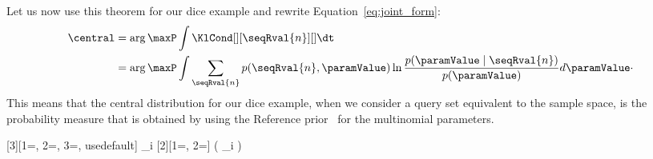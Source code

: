 Let us now use this theorem for our dice example and rewrite Equation~\ref{eq:joint_form}:
\begin{align*}
    \central &= \arg\maxP \int \KlCond[][\seqRval{n}][ ] \dt \\
    &= \arg\maxP \int \sum_{\seqRval{n}} p(\seqRval{n}, \paramValue) \ln
    \frac{p(\paramValue \mid \seqRval{n})}{p(\paramValue)} d\paramValue \cdot
\end{align*}
This means that the central distribution for our dice example, when we consider a query set equivalent to the
sample space, is the probability measure that is obtained by using the Reference prior~\cite{BERNARDO200517} for
the multinomial parameters.

\newcommand{\ratio}[1]{\frac{\avgPost[{#1}][\cMass{}]}{\cMass{#1}}}
[3][1=\w, 2=\w, 3=\cMass{}, usedefault]{
    \prod_i 
}
[2][1=\avgPost, 2=\rho]{
    \left( \prod_i  \right)
}
\newcommand{\fixedPoint}{\mu \cMass{}}
\newcommand{\fpMap}[1]{T \ifthenelse{\isempty{#1}}{}{\left[ #1 \right]}}

